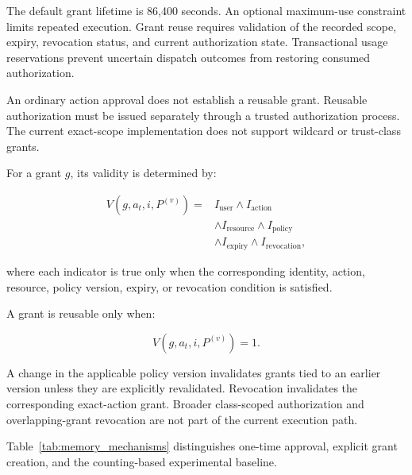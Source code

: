 \documentclass[10pt,conference]{IEEEtran}
\begin{document}
The default grant lifetime is 86,400 seconds.
An optional maximum-use constraint limits
repeated execution. Grant reuse requires
validation of the recorded scope, expiry,
revocation status, and current authorization
state. Transactional usage reservations
prevent uncertain dispatch outcomes from
restoring consumed authorization.

An ordinary action approval does not establish
a reusable grant. Reusable authorization must
be issued separately through a trusted
authorization process. The current exact-scope
implementation does not support wildcard
or trust-class grants.


For a grant $g$, its validity is determined by:

\begin{equation}
\begin{split}
V(g,a_t,i,P^{(v)}) ={}&
I_{\mathrm{user}} \land I_{\mathrm{action}}\\
&\land I_{\mathrm{resource}}
\land I_{\mathrm{policy}}\\
&\land I_{\mathrm{expiry}}
\land I_{\mathrm{revocation}},
\end{split}
\end{equation}

where each indicator is true only when the corresponding identity, action, resource, policy version, expiry, or revocation condition is satisfied.

A grant is reusable only when:

\begin{equation}
V(g,a_t,i,P^{(v)})=1.
\end{equation}

A change in the applicable policy version invalidates grants tied to an earlier version unless they are explicitly revalidated. Revocation invalidates the corresponding exact-action grant. Broader class-scoped authorization and overlapping-grant revocation are not part of the current execution path.

Table~\ref{tab:memory_mechanisms} distinguishes one-time approval, explicit grant creation, and the counting-based experimental baseline.
\end{document}
